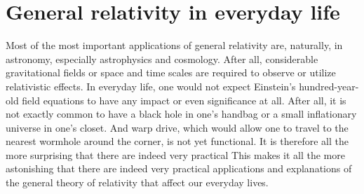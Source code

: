 %
%
%


\section{General relativity in everyday life}
Most of the most important applications of general relativity are, naturally, in astronomy, especially
astrophysics and cosmology. After all, 
considerable gravitational fields or space and time scales are required to observe or utilize relativistic effects.
In everyday life, one would not expect Einstein's
hundred-year-old field equations to have any impact or even
significance at all.
After all, it is not exactly common to have a black hole in one's
handbag or a small inflationary universe in one's
closet.
And warp drive, which would allow one to travel to the nearest wormhole around the corner, is not yet functional.
It is therefore all the more surprising that there are indeed very practical
This makes it all the more astonishing that there are indeed very practical
applications and explanations of the general theory of relativity that 
affect our everyday lives.


